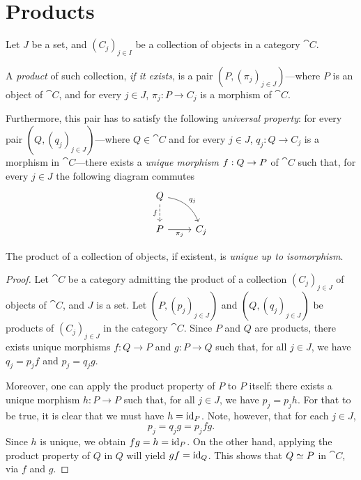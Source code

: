 \section{Products}

\begin{definition}[Product]
    \label{def:product}
    Let \(J\) be a set, and \((C_j)_{j \in I}\) be a
    collection of objects in a category \(\cat C\).

    A \emph{product} of such collection, \emph{if it exists}, is a pair
    \((P, (\pi_j)_{j \in J})\)---where \(P\) is an object of \(\cat C\), and for
    every \(j \in J\), \(\pi_j: P \to C_j\) is a morphism of \(\cat C\).

    Furthermore, this pair has to satisfy the following \emph{universal property}:
    for every pair \((Q, (q_j)_{j \in J})\)---where \(Q \in \cat C\) and for every
    \(j \in J\), \(q_j: Q \to C_j\) is a morphism in \(\cat C\)---there exists a
    \emph{unique morphism} \(f: Q \to P\) of \(\cat C\) such that, for every
    \(j \in J\) the following diagram commutes
    \[
        \begin{tikzcd}
            Q \ar[rd, "q_j", bend left] \ar[d, dashed, "f"'] & \\
            P \ar[r, "\pi_j"'] & C_j
        \end{tikzcd}
    \]
\end{definition}

\begin{proposition}[Uniqueness]
    \label{prop:product-unique-up-to-iso}
    The product of a collection of objects, if existent, is \emph{unique up to
        isomorphism}.
\end{proposition}

\begin{proof}
    Let \(\cat C\) be a category admitting the product of a collection
    \((C_j)_{j \in J}\) of objects of \(\cat C\), and \(J\) is a set. Let
    \((P, (p_j)_{j \in J})\) and \((Q, (q_j)_{j \in J})\) be products of
    \((C_j)_{j \in J}\) in the category \(\cat C\). Since \(P\) and \(Q\) are
    products, there exists unique morphisms \(f: Q \to P\) and \(g: P \to Q\) such
    that, for all \(j \in J\), we have \(q_j = p_j f\) and \(p_j = q_j g\).

    Moreover, one can apply the product property of \(P\) to \(P\) itself: there
    exists a unique morphism \(h: P \to P\) such that, for all \(j \in J\), we have
    \(p_j = p_j h\). For that to be true, it is clear that we must have
    \(h = \operatorname{id}_{P}\). Note, however, that for each \(j \in J\),
    \[
        p_j = q_j g = p_j f g.
    \]
    Since \(h\) is unique, we obtain \(f g = h = \operatorname{id}_P\).  On the other hand,
    applying the product property of \(Q\) in \(Q\) will yield \(g f = \operatorname{id}_Q\). This
    shows that \(Q \simeq P\) in \(\cat C\), via \(f\) and \(g\).
\end{proof}

